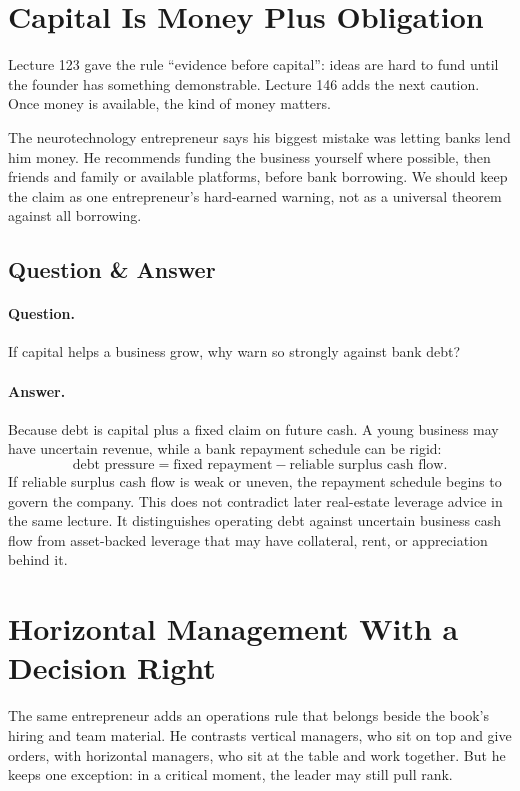 \documentclass[11pt,oneside]{book}
\begin{document}
\section{Capital Is Money Plus Obligation}

Lecture 123 gave the rule ``evidence before capital'': ideas are hard to fund until the founder has something demonstrable. Lecture 146 adds the next caution. Once money is available, the kind of money matters.

The neurotechnology entrepreneur says his biggest mistake was letting banks lend him money. He recommends funding the business yourself where possible, then friends and family or available platforms, before bank borrowing. We should keep the claim as one entrepreneur's hard-earned warning, not as a universal theorem against all borrowing.

\subsection{Question \& Answer}

\paragraph{Question.}
If capital helps a business grow, why warn so strongly against bank debt?

\paragraph{Answer.}
Because debt is capital plus a fixed claim on future cash. A young business may have uncertain revenue, while a bank repayment schedule can be rigid:
\[
\text{debt pressure}
=
\text{fixed repayment}
-
\text{reliable surplus cash flow}.
\]
If reliable surplus cash flow is weak or uneven, the repayment schedule begins to govern the company. This does not contradict later real-estate leverage advice in the same lecture. It distinguishes operating debt against uncertain business cash flow from asset-backed leverage that may have collateral, rent, or appreciation behind it.

\section{Horizontal Management With a Decision Right}

The same entrepreneur adds an operations rule that belongs beside the book's hiring and team material. He contrasts vertical managers, who sit on top and give orders, with horizontal managers, who sit at the table and work together. But he keeps one exception: in a critical moment, the leader may still pull rank.
\end{document}
